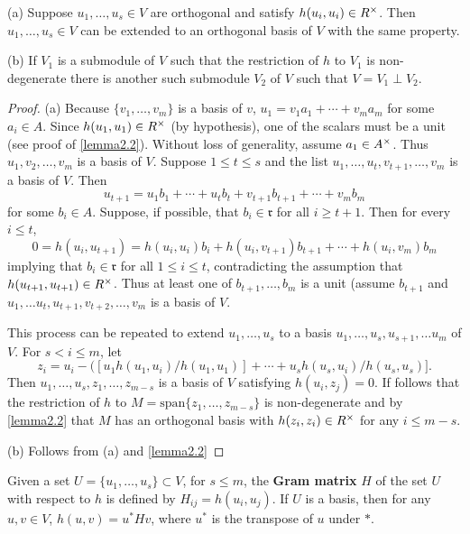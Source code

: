 \begin{lemma}\label{lemma2.3}
\begin{description}
\item{(a)} Suppose $u_1, \dotsc, u_s \in V$ are orthogonal and satisfy $h(u_i, u_i) \in R^\times$.
Then $u_1, \dotsc , u_s \in V$ can be extended to an orthogonal basis of $V$ with the same property.
\item{(b)} If $V_1$ is a submodule of $V$ such that the restriction of $h$ to $V_1$ is non-degenerate there is another such submodule $V_2$ of $V$ such that $V = V_1 \perp V_2$.
\end{description}
\end{lemma}
\begin{proof}
(a) Because $\{v_1, \dotsc, v_m \}$ is a basis of $v$, $u_1 = v_1 a_1 + \dotsb + v_m a_m$ for some $a_i \in A$.
Since $h(u_1, u_1) \in R^\times$ (by hypothesis), one of the scalars must be a unit (see proof of \cref{lemma2.2}).
Without loss of generality, assume $a_1 \in A^\times$.
Thus $u_1, v_2, \dotsc, v_m$ is a basis of $V$.
Suppose $1 \le t \le s$ and the list $u_1, \dotsc, u_t, v_{t+1}, \dotsc, v_m$ is a basis of $V$.
Then 
\[
u_{t+1} = u_1b_1 + \dotsb + u_t b_t + v_{t+1} b_{t+1} + \dotsb + v_m b_m
\]
for some $b_i \in A$.
Suppose, if possible, that $b_i \in \mathfrak{r}$ for all $i \ge t+1$.
Then for every $i \le t$,
\[
0 = h(u_i, u_{t+1}) = h(u_i, u_i) b_i + h(u_i, v_{t+1})b_{t+1} + \dotsb + h(u_i, v_m) b_m
\]
implying that $b_i \in \mathfrak{r}$ for all $1 \le i \le t$, contradicting the assumption that $h(u_{t+1}, u_{t+1}) \in R^\times$.
Thus at least one of $b_{t+1}, \dotsc,b_m$ is a unit (assume $b_{t+1}$ and $u_1, \dotsc u_t, u_{t+1}, v_{t+2}, \dotsc, v_m$ is a basis of $V$.

This process can be repeated to extend $u_1, \dotsc, u_s$ to a basis $u_1, \dotsc, u_s, u_{s+1}, \dotsc u_m$ of $V$.
For $s < i \le m$, let
\[
z_i = u_i - ([u_1h(u_1, u_i)/h(u_1, u_1)] + \dotsb + u_s h(u_s, u_i) / h(u_s, u_s)].
\]
Then $u_1, \dotsc, u_s, z_1, \dotsc, z_{m-s}$ is a basis of $V$ satisfying $h(u_i, z_j) = 0$.
If follows that the restriction of $h$ to $M = \text{span} \{z_1, \dotsc, z_{m-s}\}$ is non-degenerate and by \cref{lemma2.2} that $M$ has an orthogonal basis with $h(z_i, z_i) \in R^\times$ for any $i \le m - s$.

(b) Follows from (a) and \cref{lemma2.2}
\end{proof}

Given a set $U = \{u_1, \dotsc, u_s\} \subset V$, for $s \le m$, the \textbf{Gram matrix} $H$ of the set $U$ with respect to $h$
is defined by $H_{ij} = h(u_i, u_j)$.
If $U$ is a basis, then for any $u, v \in V$, $h(u,v) = u^*Hv$, where $u^*$ is the transpose of $u$ under $*$.

